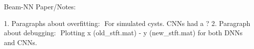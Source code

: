 \documentclass{article}
\begin{document}
Beam-NN Paper/Notes:

1. Paragraphs about overfitting:  For simulated cysts. CNNs had a ?%
2. Paragraph about debugging:  Plotting x (old_stft.mat) - y (new_stft.mat) for both DNNs and CNNs. 
\end{document}
